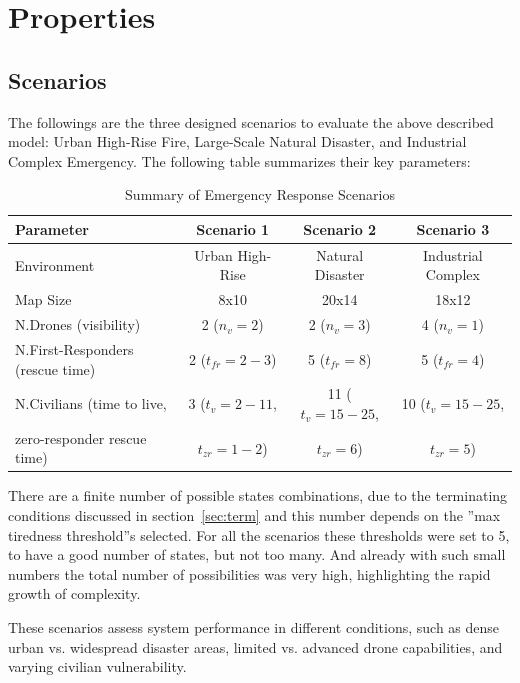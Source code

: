 
\section{Properties}

\subsection{Scenarios}

The followings are the three designed scenarios to evaluate the above described model: Urban High-Rise Fire, Large-Scale Natural Disaster, and Industrial Complex Emergency. The following table summarizes their key parameters:
\begin{table}[h]
	\centering
	\begin{tabular}{|l|c|c|c|}
		\hline
		\textbf{Parameter} & \textbf{Scenario 1} & \textbf{Scenario 2} & \textbf{Scenario 3} \\
		\hline
		Environment & Urban High-Rise & Natural Disaster & Industrial Complex \\
		Map Size & 8x10 & 20x14 & 18x12 \\
		N.Drones (visibility) & 2 ($n_v = 2$) & 2 ($n_v = 3$) & 4 ($n_v = 1$) \\
		N.First-Responders (rescue time) & 2 ($t_{fr} = 2-3$) & 5 ($t_{fr} = 8$) & 5 ($t_{fr} = 4$) \\
		N.Civilians (time to live, & 3 ($t_v = 2-11$, & 11 ($t_v = 15-25$, & 10 ($t_v = 15-25$, \\
		zero-responder rescue time) & $t_{zr} = 1-2$) & $t_{zr} = 6$) & $t_{zr} = 5$) \\
		\hline
	\end{tabular}
	\caption{Summary of Emergency Response Scenarios}
	\label{tab:scenarios}
\end{table}

There are a finite number of possible states combinations, due to the terminating conditions discussed in section~\ref{sec:term} and this number depends on the ”max tiredness threshold”s selected. For all the scenarios these thresholds were set to 5, to have a good number of states, but not too many. And already with such small numbers the total number of possibilities was very high, highlighting the rapid growth of complexity.\newline

These scenarios assess system performance in different conditions, such as dense urban vs. widespread disaster areas, limited vs. advanced drone capabilities, and varying civilian vulnerability.
